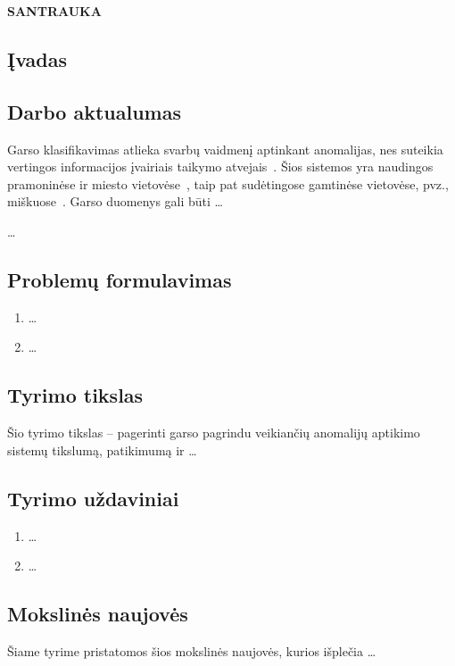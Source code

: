 \noindent\begin{minipage}{\textwidth}
	\textbf{\MakeUppercase{Santrauka}}
    \setcounter{section}{0}
	\subsection*{\k{I}vadas}\label{chap:introlt}
\end{minipage}
\subsection*{Darbo aktualumas}
Garso klasifikavimas atlieka svarbų vaidmenį aptinkant anomalijas, nes suteikia vertingos informacijos įvairiais taikymo atvejais~\citep{Kilickaya2025, LoScudo2023, Barusco2025}. Šios sistemos yra naudingos pramoninėse ir miesto vietovėse~\citep{Purohit2019, Piczak2015, Salamon2014}, taip pat sudėtingose gamtinėse vietovėse, pvz., miškuose~\citep{Bandara2023}. Garso duomenys gali būti \dots

\dots
\subsection*{Problemų formulavimas}
\begin{enumerate}[leftmargin=*]
	\item \dots
	\item \dots
\end{enumerate}
\subsection*{Tyrimo tikslas}
Šio tyrimo tikslas – pagerinti garso pagrindu veikiančių anomalijų aptikimo sistemų tikslumą, patikimumą ir \dots

\subsection*{Tyrimo uždaviniai}
\begin{enumerate}[leftmargin=*]
	\item \dots
	\item \dots
\end{enumerate}

\subsection*{Mokslinės naujovės}
Šiame tyrime pristatomos šios mokslinės naujovės, kurios išplečia \dots

